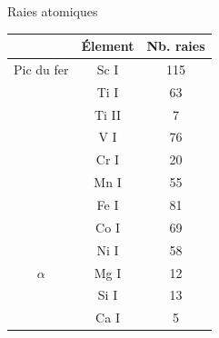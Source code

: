 \documentclass[10pt]{beamer}
\begin{document}
\begin{frame}[fragile]{Raies atomiques}

        \begin{table}[h!]
            \begin{center}
                \begin{tabular}{c|c|c}
                     & Élement & Nb. raies\\
                    \hline
                    Pic du fer & Sc I &115\\
                     & Ti I&63\\
                     & Ti II&7\\
                     & V I&76\\
                     & Cr I&20\\
                     & Mn I&55\\
                     &Fe I&81\\
                    & Co I&69\\
                    & Ni I&58\\
                    $\alpha$ & Mg I&12\\
                     & Si I&13\\
                     & Ca I& 5\\
                \end{tabular}
            \end{center}
        \end{table}

\end{frame}
\end{document}
